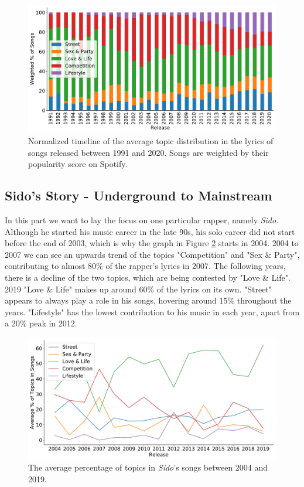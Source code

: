 \documentclass[conference]{IEEEtran}
\begin{document}
\begin{figure}[!t]
\includegraphics[width=\linewidth]{figures/w_timeline.pdf}
\vspace*{-8mm}
\caption{Normalized timeline of the average topic distribution in the lyrics of songs released between 1991 and 2020. Songs are weighted by their popularity score on Spotify.}
\label{fig:w_timeline}
\end{figure}

\subsection{Sido's Story - Underground to Mainstream}
In this part we want to lay the focus on one particular rapper, namely \textit{Sido}. Although he started his music career in the late 90s, his solo career did not start before the end of 2003, which is why the graph in Figure \ref{fig:sido} starts in 2004. 2004 to 2007 we can see an upwards trend of the topics "Competition" and "Sex \& Party", contributing to almost 80\% of the rapper's lyrics in 2007. The following years, there is a decline of the two topics, which are being contested by "Love \& Life". 2019 "Love \& Life" makes up around 60\% of the lyrics on its own. "Street" appears to always play a role in his songs, hovering around 15\% throughout the years. "Lifestyle" has the lowest contribution to his music in each year, apart from a 20\% peak in 2012.

\begin{figure}[!t]
\includegraphics[width=\linewidth]{figures/sido.pdf}
\vspace*{-8mm}
\caption{The average percentage of topics in \textit{Sido}'s songs between 2004 and 2019.}
\label{fig:sido}
\end{figure}
\end{document}
